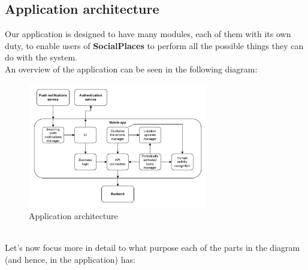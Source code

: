 \documentclass[../../main]{subfiles}
\begin{document}
\label{ss:application-architecture}
\subsection{Application architecture}
Our application is designed to have many modules, each of them with its own duty, to enable users of \textbf{SocialPlaces} to perform all the possible things they can do with the system.\\
An overview of the application can be seen in the following diagram:
\begin{figure}[h]
    \centering
    \includegraphics[width=0.7\textwidth]{images/application_architecture}
    \caption{Application architecture}\label{img:application_architecture}
\end{figure}\\
\noindent
Let's now focus more in detail to what purpose each of the parts in the diagram (and hence, in the application) has:
\end{document}
